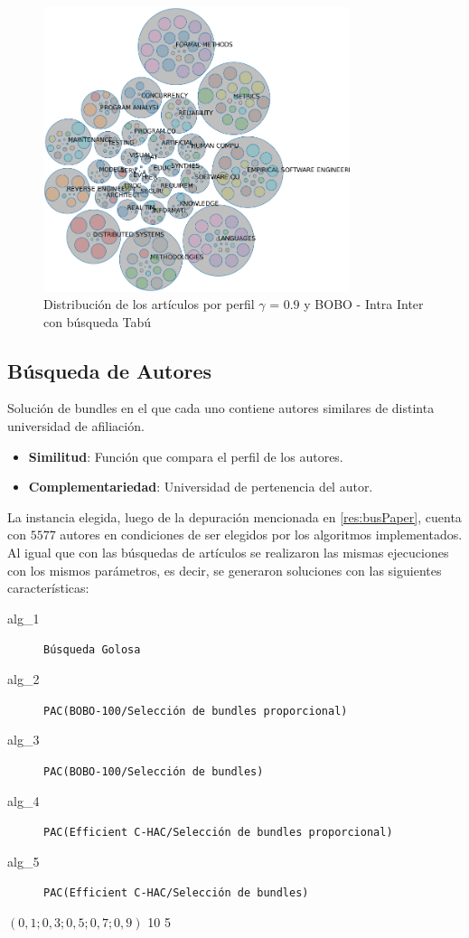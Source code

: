 \begin{figure}[H]
  \centering
    \includegraphics[width=0.8\textwidth]{resultados/papers/BOBO/INTRA_INTER/bubbles-gamma-with-local-09.png}
  \caption{Distribución de los artículos por perfil $\gamma$ = $0.9$ y BOBO - Intra Inter con búsqueda Tabú}
  \label{res:img-papers-bubbles-gamma09-hac-intra-inter-bobo}
\end{figure}
\newpage
\subsection{Búsqueda de Autores}
Solución de bundles en el que cada uno contiene autores similares de distinta universidad de afiliación.\\
\begin{itemize}
  \item \textbf{Similitud}: Función que compara el perfil de los autores.
  \item \textbf{Complementariedad}: Universidad de pertenencia del autor.
\end{itemize}

La instancia elegida, luego de la depuración mencionada en \ref{res:busPaper}, cuenta con $5577$ autores en condiciones de ser elegidos por los algoritmos implementados.\\
Al igual que con las búsquedas de artículos se realizaron las mismas ejecuciones con los mismos parámetros, es decir, se generaron soluciones con las siguientes características:\\
\Solucion
{}
{
\begin{description}
	\item[alg\_1] \texttt{Búsqueda Golosa}
	\item[alg\_2] \texttt{PAC(BOBO-100/Selección de bundles proporcional)}
	\item[alg\_3] \texttt{PAC(BOBO-100/Selección de bundles)}
	\item[alg\_4] \texttt{PAC(Efficient C-HAC/Selección de bundles proporcional)}
	\item[alg\_5] \texttt{PAC(Efficient C-HAC/Selección de bundles)}
\end{description}
}
{$(0,1; 0,3; 0,5; 0,7; 0,9)$}
{10}
{5}


